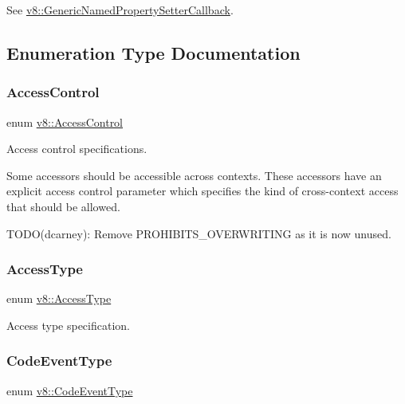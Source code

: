 See {\ttfamily \mbox{\hyperlink{namespacev8_af74716c6e95a269c6cd4314662fd0a7e}{v8\+::\+Generic\+Named\+Property\+Setter\+Callback}}}. 

\subsection{Enumeration Type Documentation}
\mbox{\label{namespacev8_a31d8355cb043d7d2dda3f4a52760b64e}} 
\subsubsection{\texorpdfstring{Access\+Control}{AccessControl}}
{\footnotesize\ttfamily enum \mbox{\hyperlink{namespacev8_a31d8355cb043d7d2dda3f4a52760b64e}{v8\+::\+Access\+Control}}}

Access control specifications.

Some accessors should be accessible across contexts. These accessors have an explicit access control parameter which specifies the kind of cross-\/context access that should be allowed.

T\+O\+D\+O(dcarney)\+: Remove P\+R\+O\+H\+I\+B\+I\+T\+S\+\_\+\+O\+V\+E\+R\+W\+R\+I\+T\+I\+NG as it is now unused. \mbox{\label{namespacev8_add8bef6469c5b94706584124e610046c}} 
\subsubsection{\texorpdfstring{Access\+Type}{AccessType}}
{\footnotesize\ttfamily enum \mbox{\hyperlink{namespacev8_add8bef6469c5b94706584124e610046c}{v8\+::\+Access\+Type}}}

Access type specification. \mbox{\label{namespacev8_af0ff31131cc32ced9b5279b321569bbc}} 
\subsubsection{\texorpdfstring{Code\+Event\+Type}{CodeEventType}}
{\footnotesize\ttfamily enum \mbox{\hyperlink{namespacev8_af0ff31131cc32ced9b5279b321569bbc}{v8\+::\+Code\+Event\+Type}}}


